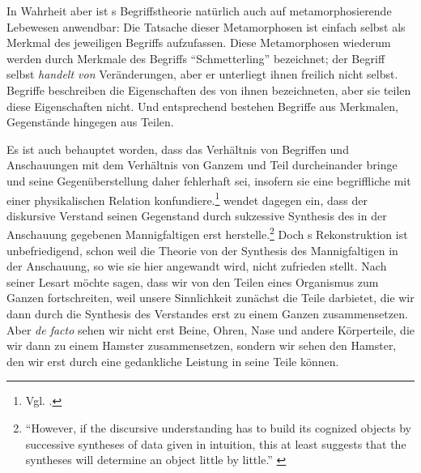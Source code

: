 In Wahrheit aber ist s Begriffstheorie natürlich
auch auf metamorphosierende Lebewesen anwendbar: Die Tatsache dieser
Metamorphosen ist einfach selbst als Merkmal des jeweiligen Begriffs
aufzufassen. Diese Metamorphosen wiederum werden durch Merkmale des Begriffs
\enquote{Schmetterling} bezeichnet; der Begriff selbst \emph{handelt von}
Veränderungen, aber er unterliegt ihnen freilich nicht selbst. Begriffe
beschreiben die Eigenschaften des von ihnen bezeichneten, aber sie teilen diese
Eigenschaften nicht. Und entsprechend bestehen Begriffe aus Merkmalen,
Gegenstände hingegen aus Teilen.

Es ist auch behauptet worden, dass  das Verhältnis von
Begriffen und Anschauungen mit dem Verhältnis von Ganzem und Teil durcheinander
bringe und seine Gegenüberstellung daher fehlerhaft
sei, insofern sie eine begriffliche mit einer
physikalischen Relation konfundiere.\footnote{Vgl.
\cite[][62--67]{Rang:ZweckmaessigkeitZweckursaechlichkeitundGanzheitlichkeitinderorganischenNatur1993}.}
 wendet
dagegen ein, dass der diskursive Verstand seinen Gegenstand
durch sukzessive Synthesis des in der Anschauung gegebenen Mannigfaltigen erst herstelle.\footnote{\enquote{However, if the
discursive understanding has to build its cognized objects by successive syntheses of data
given in intuition, this at least suggests that the syntheses will determine an
object little by little.}
\parencite[][147]{Quarfood:DiscursivityandTranscendentalIdealism2012}} Doch
s Rekonstruktion
ist unbefriedigend, schon weil die Theorie von der Synthesis des
Mannigfaltigen in der Anschauung, so wie sie hier angewandt wird, nicht
zufrieden stellt. Nach seiner Lesart möchte  sagen, dass
wir von den Teilen eines Organismus zum Ganzen fortschreiten, weil unsere
Sinnlichkeit zunächst die Teile darbietet, die wir dann durch die Synthesis des
Verstandes erst zu einem Ganzen zusammensetzen. Aber \emph{de facto} sehen wir
nicht erst Beine, Ohren, Nase und andere Körperteile, die wir dann zu einem
Hamster zusammensetzen, sondern wir sehen den Hamster, den wir erst durch eine
gedankliche Leistung in seine Teile  können.

